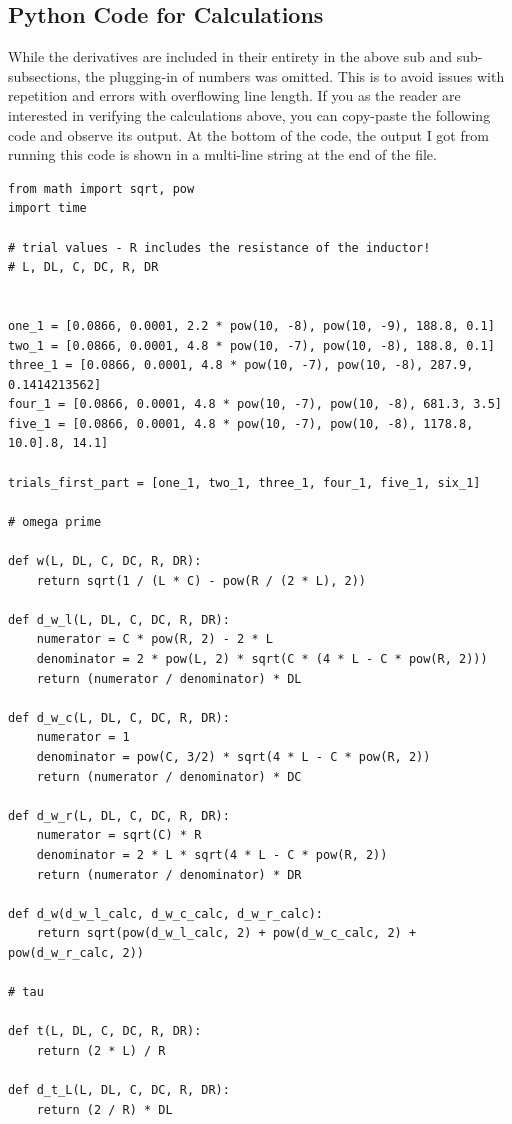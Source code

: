 \documentclass[12pt]{article}
\begin{document}
\clearpage
\subsection{Python Code for Calculations}
While the derivatives are included in their entirety in the above sub and sub-subsections, the plugging-in of numbers was omitted. This is to avoid issues with repetition and errors with overflowing line length. If you as the reader are interested in verifying the calculations above, you can copy-paste the following code and observe its output. At the bottom of the code, the output I got from running this code is shown in a multi-line string at the end of the file.

\begin{verbatim}
from math import sqrt, pow
import time

# trial values - R includes the resistance of the inductor!
# L, DL, C, DC, R, DR


one_1 = [0.0866, 0.0001, 2.2 * pow(10, -8), pow(10, -9), 188.8, 0.1] 
two_1 = [0.0866, 0.0001, 4.8 * pow(10, -7), pow(10, -8), 188.8, 0.1] 
three_1 = [0.0866, 0.0001, 4.8 * pow(10, -7), pow(10, -8), 287.9, 0.1414213562]
four_1 = [0.0866, 0.0001, 4.8 * pow(10, -7), pow(10, -8), 681.3, 3.5]
five_1 = [0.0866, 0.0001, 4.8 * pow(10, -7), pow(10, -8), 1178.8, 10.0].8, 14.1]

trials_first_part = [one_1, two_1, three_1, four_1, five_1, six_1]

# omega prime

def w(L, DL, C, DC, R, DR):
    return sqrt(1 / (L * C) - pow(R / (2 * L), 2))

def d_w_l(L, DL, C, DC, R, DR):
    numerator = C * pow(R, 2) - 2 * L
    denominator = 2 * pow(L, 2) * sqrt(C * (4 * L - C * pow(R, 2)))
    return (numerator / denominator) * DL

def d_w_c(L, DL, C, DC, R, DR):
    numerator = 1
    denominator = pow(C, 3/2) * sqrt(4 * L - C * pow(R, 2))
    return (numerator / denominator) * DC

def d_w_r(L, DL, C, DC, R, DR):
    numerator = sqrt(C) * R
    denominator = 2 * L * sqrt(4 * L - C * pow(R, 2))
    return (numerator / denominator) * DR

def d_w(d_w_l_calc, d_w_c_calc, d_w_r_calc):
    return sqrt(pow(d_w_l_calc, 2) + pow(d_w_c_calc, 2) + pow(d_w_r_calc, 2))

# tau

def t(L, DL, C, DC, R, DR):
    return (2 * L) / R

def d_t_L(L, DL, C, DC, R, DR):
    return (2 / R) * DL


\end{verbatim}
\end{document}
